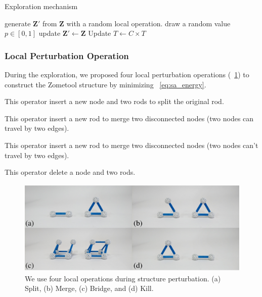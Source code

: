 \begin{algorithm}[!ht]
\caption{Exploration mechanism}
\label{alg:exploration}
\begin{algorithmic}[1]
\Repeat
    \State generate $\mathbf{Z}'$ from $\mathbf{Z}$ with a random local operation.
    \State draw a random value $p \in [0, 1]$ 
        \State update $\mathbf{Z}' \leftarrow \mathbf{Z}$
    \EndIf
    \State Update $T \leftarrow C\times T$ 
\EndProcedure
\end{algorithmic}
\end{algorithm}

\subsubsection{Local Perturbation Operation}
During the exploration, we proposed four local perturbation operations (\figname~\ref{fig:local_op}) to construct the Zometool structure by minimizing \eqname~\ref{eq:sa_energy}.
\begin{description}[nosep,itemsep=0pt,leftmargin=0pt]
\item[Split] This operator insert a new node and  two rods to split the original rod.
\item[Merge] This operator insert a new rod to merge two disconnected nodes (two nodes can travel by two edges). 
\item[Bridge] This operator insert a new rod to merge two disconnected nodes (two nodes can't travel by two edges).
\item[Kill] This operator delete a node and two rods.
\end{description}

\begin{figure}[ht]
\centering
\includegraphics[width=1.0\linewidth]{figs/local_opt.pdf} 
\caption{We use four local operations during structure perturbation. (a) Split, (b) Merge, (c) Bridge, and (d) Kill.}
\label{fig:local_op}
\end{figure}

